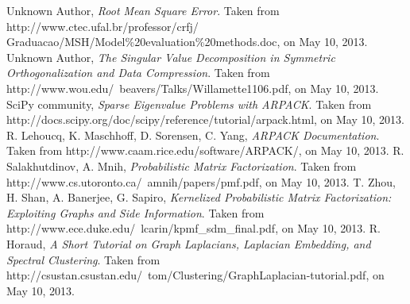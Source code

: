 \documentclass[journal]{IEEEtran}
\begin{document}
%

\begin{thebibliography}{1}
Unknown Author, \emph{Root Mean Square Error}. Taken from http://www.ctec.ufal.br/professor/crfj/\\
Graduacao/MSH/Model\%20evaluation\%20methods.doc, on May 10, 2013.
Unknown Author, \emph{The Singular Value Decomposition in Symmetric Orthogonalization and Data Compression}.
Taken from http://www.wou.edu/~beavers/Talks/Willamette1106.pdf, on May 10, 2013.
SciPy community, \emph{Sparse Eigenvalue Problems with ARPACK}. 
Taken from http://docs.scipy.org/doc/scipy/reference/tutorial/arpack.html, on May 10, 2013.
R. Lehoucq, K. Maschhoff, D. Sorensen, C. Yang, \emph{ARPACK Documentation}. Taken from http://www.caam.rice.edu/software/ARPACK/, on May 10, 2013.
R. Salakhutdinov, A. Mnih, \emph{Probabilistic Matrix Factorization}. Taken from http://www.cs.utoronto.ca/~amnih/papers/pmf.pdf, on May 10, 2013.
T. Zhou, H. Shan, A. Banerjee, G. Sapiro, \emph{Kernelized Probabilistic Matrix Factorization: Exploiting Graphs and Side Information}. 
Taken from http://www.ece.duke.edu/~lcarin/kpmf\_sdm\_final.pdf, on May 10, 2013.
R. Horaud, \emph{A Short Tutorial on Graph Laplacians, Laplacian Embedding, and Spectral Clustering}. Taken from 
http://csustan.csustan.edu/~tom/Clustering/GraphLaplacian-tutorial.pdf, on May 10, 2013.
\end{thebibliography}




\enlargethispage{-5in}
\end{document}
